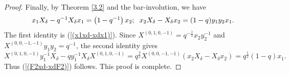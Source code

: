 \documentclass[reqno,11pt]{amsart}
\numberwithin{equation}{section}
\begin{document}
\begin{proof}
	Finally, by Theorem \ref{3.2} and the bar-involution, we have
		\begin{eqnarray*}
		x_1 X_\delta-q^{-1} X_\delta x_1  =\left(1-q^{-1}\right) x_2;\hspace{0.2cm}
		x_2 X_\delta-X_\delta x_2  =(1-q) y_1 y_2 x_1 .
	\end{eqnarray*}
	The first identity is (\ref{(x1xd-xdx1)}). Since $X^{(0,1,0,-1)}=q^{-\frac{1}{2}} x_2 y_2^{-1}$ and $X^{(0,0,-1,-1)} y_1 y_2=q^{-1}$, the second identity gives
	$$X^{(0,1,0,-1)} y_1^{-1} X_\delta-q y_1^{-1} X_\delta X^{(0,1,0,-1)}=q^{\frac{3}{2}} X^{(0,0,-1,-1)}\left(x_2 X_\delta-X_\delta x_2\right)=q^{\frac{1}{2}}(1-q) x_1 .$$
	Thus (\ref{(F2xd-xdF2)}) follows. This proof is complete.
\end{proof}
\end{document}
